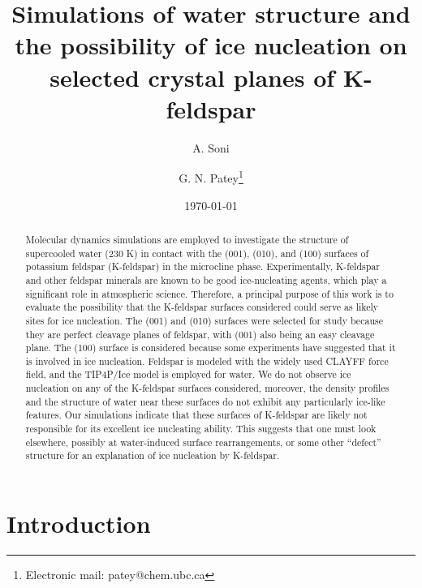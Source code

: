 \documentclass[preprint,aps,prb,floatfix]{revtex4-1}
\date{\today}
\begin{document}
\author{A. Soni}
\author{G. N. Patey\footnote{Electronic mail: patey@chem.ubc.ca}}

\title{Simulations of water structure and the possibility of ice nucleation on selected crystal planes of K-feldspar}

\newcommand{\kJmol}{kJ mol$^{-1}$}
\newcommand{\boldr}{{\bm r}}

\begin{abstract}

Molecular dynamics simulations are employed to investigate the structure of supercooled water (230 K) in contact with the (001), (010), and (100) surfaces of potassium feldspar (K-feldspar) in the microcline phase. Experimentally, K-feldspar and other feldspar minerals are known to be good ice-nucleating agents, which play a significant role in atmospheric science. Therefore, a principal purpose of this work is to evaluate the possibility that the K-feldspar surfaces considered could serve as likely sites for ice nucleation. The (001) and (010) surfaces were selected for study because they are perfect cleavage planes of feldspar, with (001) also being an easy cleavage plane. The (100) surface is considered because some experiments have suggested that it is involved in ice nucleation. Feldspar is modeled with the widely used CLAYFF force field, and the TIP4P/Ice model is employed for water. We do not observe ice nucleation on any of the K-feldspar surfaces considered, moreover, the density profiles and the structure of water near these surfaces do not exhibit any particularly ice-like features. Our simulations indicate that these surfaces of K-feldspar are likely not responsible for its excellent ice nucleating ability. This suggests that one must look elsewhere, possibly at water-induced surface rearrangements, or some other ``defect'' structure for an explanation of ice nucleation by K-feldspar.  

\end{abstract}

\maketitle

\section{Introduction}
\end{document}
